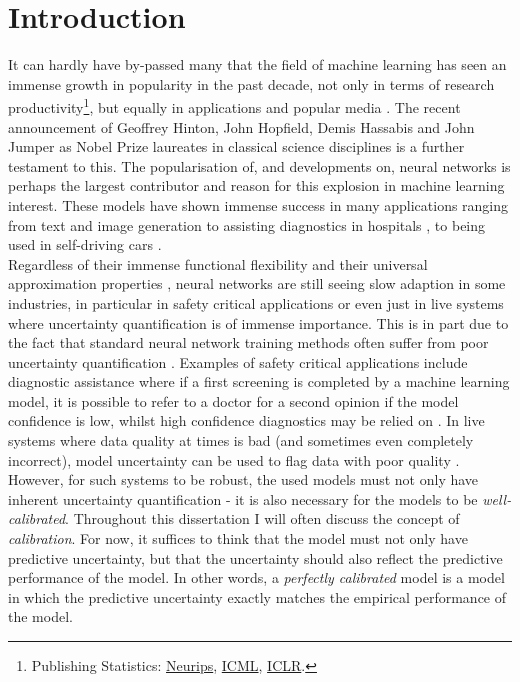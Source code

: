 \chapter{Introduction}

It can hardly have by-passed many that the field of machine learning has seen an immense growth in popularity in the past decade, not only in terms of research productivity\footnote{Publishing Statistics: \href{https://papercopilot.com/statistics/neurips-statistics/}{Neurips}, \href{https://papercopilot.com/statistics/icml-statistics/}{ICML}, \href{https://papercopilot.com/statistics/iclr-statistics/}{ICLR}.}, but equally in applications and popular media \citep{2018_ukmediacoverage, 2021_industryapps}. The recent announcement of Geoffrey Hinton, John Hopfield, Demis Hassabis and John Jumper as Nobel Prize laureates in classical science disciplines is a further testament to this. The popularisation of, and developments on, neural networks is perhaps the largest contributor and reason for this explosion in machine learning interest. These models have shown immense success in many applications ranging from text  \citep{2023_GPT3} and image generation \citep{2022_stablediffusion} to assisting diagnostics in hospitals \citep{2019_breastcancerassistance,2022_mlinhealthcarereview}, to being used in self-driving cars \citep{2017_selfdrivingcars,2021_selfdrivingcarssurvey}.\\

\noindent Regardless of their immense functional flexibility and their universal approximation properties \citep{1989_cybenkouniversal, 1989_hornikuniversal}, neural networks are still seeing slow adaption in some industries, in particular in safety critical applications or even just in live systems where uncertainty quantification is of immense importance. This is in part due to the fact that standard neural network training methods often suffer from poor uncertainty quantification \citep{2017_calibmodernnn}. Examples of safety critical applications include diagnostic assistance where if a first screening is completed by a machine learning model, it is possible to refer to a doctor for a second opinion if the model confidence is low, whilst high confidence diagnostics may be relied on \citep{2021_usinguncertaintyhealthcare}. In live systems where data quality at times is bad (and sometimes even completely incorrect), model uncertainty can be used to flag data with poor quality \citep{2024_mriuncertainty}. However, for such systems to be robust, the used models must not only have inherent uncertainty quantification - it is also necessary for the models to be \textit{well-calibrated}. Throughout this dissertation I will often discuss the concept of \textit{calibration}. For now, it suffices to think that the model must not only have predictive uncertainty, but that the uncertainty should also reflect the predictive performance of the model. In other words, a \textit{perfectly calibrated} model is a model in which the predictive uncertainty exactly matches the empirical performance of the model. \\

